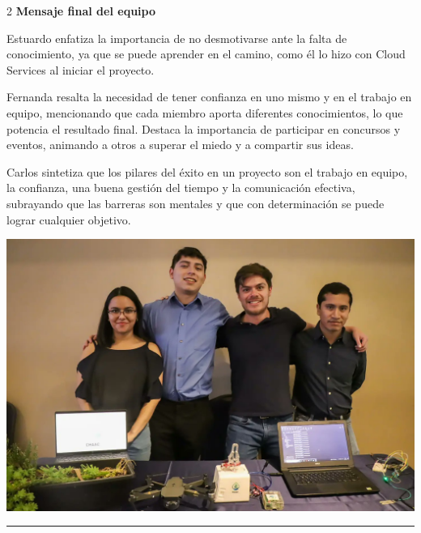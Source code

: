 \documentclass[12pt,spanish,Letterpaper,openany]{book}
\newcommand{\HRule}{\begin{center}\rule{0.5\linewidth}{0.2mm}\end{center}}
\begin{document}
\begin {multicols}{2}
\textbf{Mensaje final del equipo}

Estuardo enfatiza la importancia de no desmotivarse ante la falta de conocimiento, ya que se puede aprender en el camino, como él lo hizo con Cloud Services al iniciar el proyecto.

\bigskip
\bigskip

Fernanda resalta la necesidad de tener confianza en uno mismo y en el trabajo en equipo, mencionando que cada miembro aporta diferentes conocimientos, lo que potencia el resultado final. Destaca la importancia de participar en concursos y eventos, animando a otros a superar el miedo y a compartir sus ideas.

Carlos sintetiza que los pilares del éxito en un proyecto son el trabajo en equipo, la confianza, una buena gestión del tiempo y la comunicación efectiva, subrayando que las barreras son mentales y que con determinación se puede lograr cualquier objetivo.

\begin {flushleft}
\noindent\begin{minipage}[c]{\columnwidth}

\begin{center}\includegraphics[width=1\linewidth]{imagenes_articulos/spchaac_01} \end{center}

\end{minipage}
\end {flushleft}

\end {multicols}

\medskip

\HRule
\end{document}
